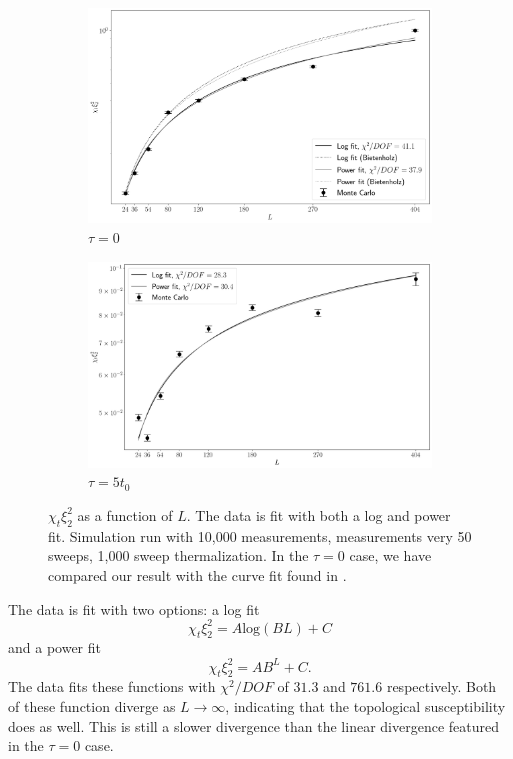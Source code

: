 \begin{figure}[h]
    \begin{center}
      \begin{subfigure}[b]{\textwidth}
          \includegraphics[width=\textwidth]{imgs/divergence.png}
          \caption{$\tau = 0$}
      \end{subfigure}

      \begin{subfigure}[b]{\textwidth}
          \includegraphics[width=\textwidth]{imgs/divergence_flowed.png}
          \caption{$\tau = 5t_0$}
      \end{subfigure}
      \caption{\label{fig:bietenholz} $\chi_t\xi_2^2$ as a function of $L$. The data is fit with both a log and power fit. Simulation run with 10,000 measurements, measurements very 50 sweeps, 1,000 sweep thermalization. In the $\tau=0$ case, we have compared our result with the curve fit found in \cite{bietenholz2018}.}
    \end{center}
\end{figure}
The data is fit with two options: a log fit
\begin{equation}
    \chi_t \xi_2^2 = A \mathrm{log}(B L) + C
\end{equation}
and a power fit
\begin{equation}
    \chi_t \xi_2^2 = A B^L + C.
\end{equation}
The data fits these functions with $\chi^2/DOF$ of $31.3$ and $761.6$ respectively. Both of these function diverge as $L\rightarrow \infty$, indicating that the topological susceptibility does as well. This is still a slower divergence than the linear divergence featured in the $\tau=0$ case.

